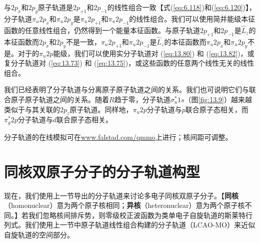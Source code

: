     与$2p_x$和$2p_y$原子轨道是$2p_{+1}$和$2p_{-1}$的线性组合一致【式(\ref{eq:6.118})和(\ref{eq:6.120})】，分子轨道$\pi_u2p_x$和$\pi_u2p_y$是$\pi_u2p_{+1}$和$\pi_u2p_{-1}$的线性组合。我们可以使用简并能级本征函数的任意线性组合，仍然得到一个能量本征函数。与原子轨道$2p_{+1}$和$2p_{-1}$是$\hat{L}_z$的本征函数而$2p_x$和$2p_y$不是一致，$\pi_u2p_{+1}$和$\pi_u2p_{-1}$是$\hat{L}_z$的本征函数而$\pi_u2p_x$和$\pi_u2p_y$不是。对于的$\pi_u2p$能级，我们可以使用实分子轨道对 (\ref{eq:13.80}) 和 (\ref{eq:13.82})，或复分子轨道对 (\ref{eq:13.73}) 和 (\ref{eq:13.75})，或这些函数的任意两个线性无关的线性组合。

    我们已经表明了分子轨道与分离原子原子轨道之间的关系。我们也可说明它们与联合原子原子轨道之间的关系。随着$R$趋于零，分子轨道$\sigma_u^*1s$（图\ref{fig:13.9}）越来越类似于与其关联的$2p_z$原子轨道。同样地，$\pi_u2p$分子轨道与$p$联合原子态相关，而$\pi_g^*2p$分子轨道与$d$联合原子态相关。

    分子轨道的在线模拟可在\url{www.falstad.com/qmmo}上进行；核间距可调整。

\section{同核双原子分子的分子轨道构型}
\label{sec:13.7 MO Configurations for Homonuclear Diatomic Molecules}

    现在，我们使用上一节导出的分子轨道来讨论多电子同核双原子分子。【\textbf{同核}（homonuclear）意为两个原子核相同；\textbf{异核}（heteronuclear）意为两个原子核不同。】若我们忽略核间排斥势，则零级校正波函数为类单电子自旋轨道的斯莱特行列式。我们使用上一节中原子轨道线性组合构建的分子轨道（LCAO-MO）来近似自旋轨道的空间部分。

